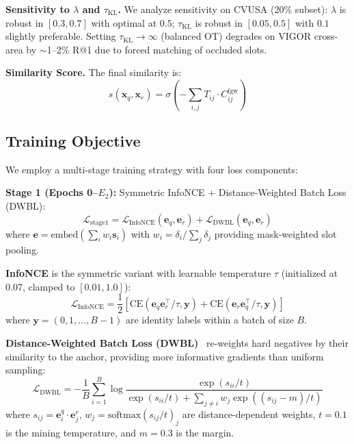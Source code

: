 \documentclass{article}
\newcommand{\cL}{\mathcal{L}}
\begin{document}
\textbf{Sensitivity to $\lambda$ and $\tau_{\text{KL}}$.}
We analyze sensitivity on CVUSA (20\% subset): $\lambda$ is robust in $[0.3, 0.7]$ with optimal at $0.5$; $\tau_{\text{KL}}$ is robust in $[0.05, 0.5]$ with $0.1$ slightly preferable. Setting $\tau_{\text{KL}} \to \infty$ (balanced OT) degrades on VIGOR cross-area by $\sim$1--2\% R@1 due to forced matching of occluded slots.

\textbf{Similarity Score.}
The final similarity is:
\begin{equation}
    s(\mathbf{x}_q, \mathbf{x}_r) = \sigma\!\left(-\sum_{i,j} T_{ij} \cdot C^{\text{fgw}}_{ij}\right)
\end{equation}

\subsection{Training Objective}\label{sec:loss}

We employ a multi-stage training strategy with four loss components:

\textbf{Stage 1 (Epochs 0--$E_2$):} Symmetric InfoNCE + Distance-Weighted Batch Loss (DWBL):
\begin{equation}
    \cL_{\text{stage1}} = \cL_{\text{InfoNCE}}(\mathbf{e}_q, \mathbf{e}_r) + \cL_{\text{DWBL}}(\mathbf{e}_q, \mathbf{e}_r)
\end{equation}
where $\mathbf{e} = \text{embed}(\sum_i w_i \mathbf{s}_i)$ with $w_i = \delta_i / \sum_j \delta_j$ providing mask-weighted slot pooling.

\textbf{InfoNCE} is the symmetric variant with learnable temperature $\tau$ (initialized at 0.07, clamped to $[0.01, 1.0]$):
\begin{equation}
    \cL_{\text{InfoNCE}} = \frac{1}{2}\left[\text{CE}(\mathbf{e}_q \mathbf{e}_r^\top / \tau, \mathbf{y}) + \text{CE}(\mathbf{e}_r \mathbf{e}_q^\top / \tau, \mathbf{y})\right]
\end{equation}
where $\mathbf{y} = (0, 1, \ldots, B{-}1)$ are identity labels within a batch of size $B$.

\textbf{Distance-Weighted Batch Loss (DWBL)}~\cite{wu2017sampling} re-weights hard negatives by their similarity to the anchor, providing more informative gradients than uniform sampling:
\begin{equation}
    \cL_{\text{DWBL}} = -\frac{1}{B}\sum_{i=1}^B \log \frac{\exp(s_{ii} / t)}{\exp(s_{ii} / t) + \sum_{j \neq i} w_j \exp((s_{ij} - m) / t)}
\end{equation}
where $s_{ij} = \mathbf{e}_i^q \cdot \mathbf{e}_j^r$, $w_j = \text{softmax}(s_{ij}/t)_j$ are distance-dependent weights, $t = 0.1$ is the mining temperature, and $m = 0.3$ is the margin.
\end{document}
